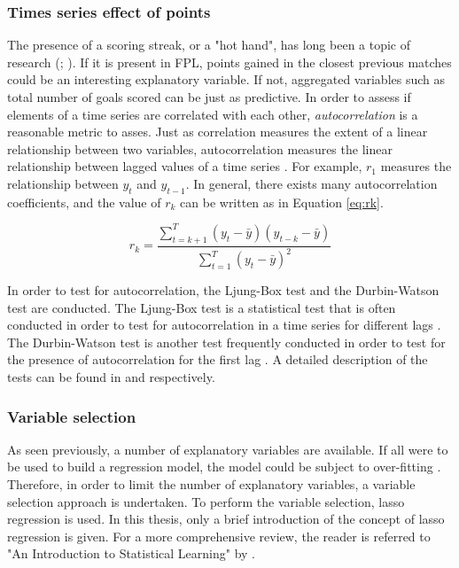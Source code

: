 \subsubsection{Times series effect of points}

The presence of a scoring streak, or a "hot hand", has long been a topic of research (\cite{hot_hand}; \cite{hot_hand_2}). If it is present in FPL, points gained in the closest previous matches could be an interesting explanatory variable. If not, aggregated variables such as total number of goals scored can be just as predictive. In order to assess if elements of a time series are correlated with each other, \textit{autocorrelation} is a reasonable metric to asses. Just as correlation measures the extent of a linear relationship between two variables, autocorrelation measures the linear relationship between lagged values of a time series \citep{Hyndman}. For example, $r_1$ measures the relationship between $y_t$ and $y_{t-1}$. In general, there exists many autocorrelation coefficients, and the value of $r_k$ can be written as in Equation \ref{eq:rk}. 


\begin{equation}\label{eq:rk}
    r_k = \frac{\sum_{t=k+1}^T(y_t-\bar{y})(y_{t-k}-\bar{y})}{\sum_{t=1}^T(y_t-\bar{y})^2}
\end{equation}

In order to test for autocorrelation, the Ljung-Box test and the Durbin-Watson test are conducted. The Ljung-Box test is a statistical test that is often conducted in order to test for autocorrelation in a time series for different lags \citep{Hyndman}. The Durbin-Watson test is another test frequently conducted in order to test for the presence of autocorrelation for the first lag \citep{Carol_1}. A detailed description of the tests can be found in \cite{Hyndman} and \cite{Carol_1} respectively.

\subsubsection{Variable selection}

As seen previously, a number of explanatory variables are available. If all were to be used to build a regression model, the model could be subject to over-fitting \citep{ISLR}. Therefore, in order to limit the number of explanatory variables, a variable selection approach is undertaken. To perform the variable selection, lasso regression is used. In this thesis, only a brief introduction of the concept of lasso regression is given. For a more comprehensive review, the reader is referred to "An Introduction to Statistical Learning" by \cite{ISLR}.\newpar

